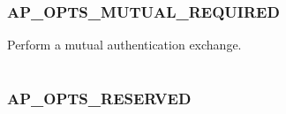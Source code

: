 \documentclass[letterpaper,10pt,english]{sphinxmanual}
\begin{document}
\begin{fulllineitems}
\label{appdev/refs/macros/AP_OPTS_ETYPE_NEGOTIATION:AP_OPTS_ETYPE_NEGOTIATION}
\end{fulllineitems}


\begin{tabulary}{\linewidth}{|L|L|}
\hline

 & 
\\
\hline\end{tabulary}



\subsubsection{AP\_OPTS\_MUTUAL\_REQUIRED}
\label{appdev/refs/macros/AP_OPTS_MUTUAL_REQUIRED:ap-opts-mutual-required}\label{appdev/refs/macros/AP_OPTS_MUTUAL_REQUIRED:ap-opts-mutual-required-data}\label{appdev/refs/macros/AP_OPTS_MUTUAL_REQUIRED::doc}

\begin{fulllineitems}
\label{appdev/refs/macros/AP_OPTS_MUTUAL_REQUIRED:AP_OPTS_MUTUAL_REQUIRED}
\end{fulllineitems}


Perform a mutual authentication exchange.

\begin{tabulary}{\linewidth}{|L|L|}
\hline

 & 
\\
\hline\end{tabulary}



\subsubsection{AP\_OPTS\_RESERVED}
\label{appdev/refs/macros/AP_OPTS_RESERVED::doc}\label{appdev/refs/macros/AP_OPTS_RESERVED:ap-opts-reserved-data}\label{appdev/refs/macros/AP_OPTS_RESERVED:ap-opts-reserved}

\begin{fulllineitems}
\label{appdev/refs/macros/AP_OPTS_RESERVED:AP_OPTS_RESERVED}
\end{fulllineitems}
\end{document}
